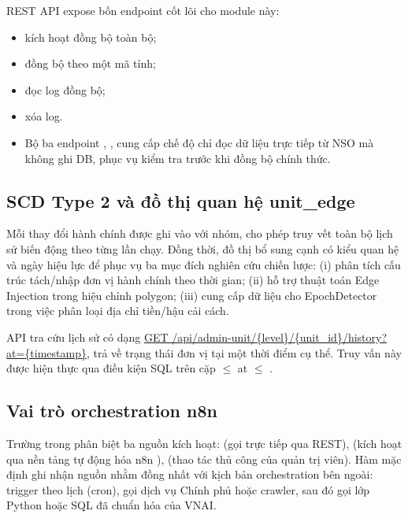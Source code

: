 REST API expose bốn endpoint cốt lõi cho module này: 
\begin{itemize}
    \item {} kích hoạt đồng bộ toàn bộ; 
    \item {} đồng bộ theo một mã tỉnh; 
    \item {} đọc log đồng bộ; 
    \item {} xóa log. 
     
    \item Bộ ba endpoint , ,  cung cấp chế độ chỉ đọc dữ liệu trực tiếp từ NSO mà không ghi DB, phục vụ kiểm tra trước khi đồng bộ chính thức.
\end{itemize}


\subsection{SCD Type 2 và đồ thị quan hệ unit\_edge}
\label{sec:scd-graph}

Mỗi thay đổi hành chính được ghi vào  với  nhóm, cho phép truy vết toàn bộ lịch sử biến động theo từng lần chạy. Đồng thời, đồ thị  bổ sung cạnh có kiểu quan hệ và ngày hiệu lực để phục vụ ba mục đích nghiên cứu chiến lược: (i) phân tích cấu trúc tách/nhập đơn vị hành chính theo thời gian; (ii) hỗ trợ thuật toán Edge Injection trong hiệu chỉnh polygon; (iii) cung cấp dữ liệu cho EpochDetector trong việc phân loại địa chỉ tiền/hậu cải cách.

API tra cứu lịch sử có dạng \url{GET /api/admin-unit/{level}/{unit_id}/history?at={timestamp}}, trả về trạng thái đơn vị tại một thời điểm cụ thể. Truy vấn này được hiện thực qua điều kiện SQL trên cặp  $\leq$ at $\leq$ .

\subsection{Vai trò orchestration n8n}
\label{sec:n8n}

Trường  trong  phân biệt ba nguồn kích hoạt:  (gọi trực tiếp qua REST),  (kích hoạt qua nền tảng tự động hóa n8n \cite{n8n2024}),  (thao tác thủ công của quản trị viên). Hàm  mặc định ghi nhận nguồn  nhằm đồng nhất với kịch bản orchestration bên ngoài: trigger theo lịch (cron), gọi dịch vụ Chính phủ hoặc crawler, sau đó gọi lớp Python hoặc SQL đã chuẩn hóa của VNAI.

